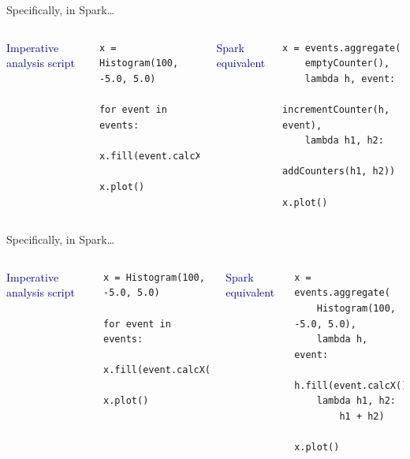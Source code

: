 \documentclass[aspectratio=169]{beamer}
\begin{document}
\begin{frame}[fragile]{Specifically, in Spark\ldots}
\vspace{0.5 cm}
\begin{columns}

\textcolor{darkblue}{Imperative analysis script}
\small
\begin{verbatim}
x = Histogram(100, -5.0, 5.0)

for event in events:
    x.fill(event.calcX())

x.plot()
\end{verbatim}

\textcolor{darkblue}{Spark equivalent}
\small
\begin{verbatim}
x = events.aggregate(
    emptyCounter(),
    lambda h, event:
        incrementCounter(h, event),
    lambda h1, h2:
        addCounters(h1, h2))

x.plot()
\end{verbatim}
\end{columns}
\end{frame}

\begin{frame}[fragile]{Specifically, in Spark\ldots}
\vspace{0.5 cm}
\begin{columns}

\textcolor{darkblue}{Imperative analysis script}
\small
\begin{verbatim}
x = Histogram(100, -5.0, 5.0)

for event in events:
    x.fill(event.calcX())

x.plot()
\end{verbatim}

\textcolor{darkblue}{Spark equivalent}
\small
\begin{verbatim}
x = events.aggregate(
    Histogram(100, -5.0, 5.0),
    lambda h, event:
        h.fill(event.calcX()),
    lambda h1, h2:
        h1 + h2)

x.plot()
\end{verbatim}
\end{columns}
\end{frame}
\end{document}
